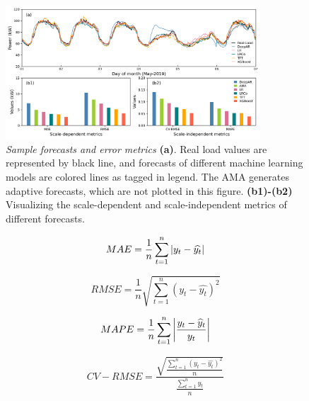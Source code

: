 \begin{figure}[!ht]
\centering
  \includegraphics[width=0.85\textwidth]{figures/fig-1-load-prediction-and-metrics.png}
  \caption{\textit{Sample forecasts and error metrics} \textbf{(a)}. Real load values are represented by black line, and forecasts of different machine learning models are colored lines as tagged in legend. The AMA generates adaptive forecasts, which are not plotted in this figure. \textbf{(b1)-(b2)} Visualizing the scale-dependent and scale-independent metrics of different forecasts. }
  \label{fig:prediction}
\end{figure}

\begin{equation} \label{eq:MAE}
    MAE = \frac{1}{n} \sum_{t=1}^{n}\abs{y_{t}-\widehat{y_{t}}}
\end{equation}

\begin{equation}
    RMSE = \frac{1}{n} \sqrt {\sum_{t=1}^{n}(y_{t}-\widehat{y_{t}})^{2}}
\end{equation}

\begin{equation}
    MAPE = \frac{1}{n}\sum_{t=1}^{n} \abs{\frac{y_t-\widehat{y}_t}{y_t}}
\end{equation}
    
\begin{equation} \label{eq:CV-RMSE}
    CV-RMSE = \frac{\sqrt{\frac{\sum_{t=1}^{n}(y_{t}-\widehat{y_{t}})^{2}}{n}}} {\frac{\sum_{t=1}^{n} y_{t}}{n}}
\end{equation}

  
